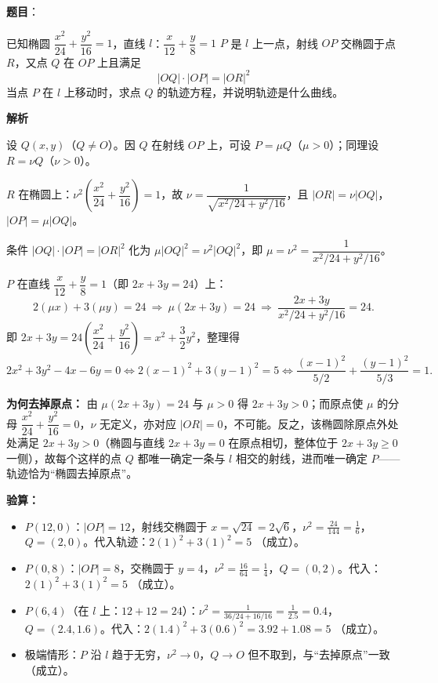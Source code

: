 \begin{answer}

\textbf{题目}：

已知椭圆 $\dfrac{x^2}{24}+\dfrac{y^2}{16}=1$，直线 $l$：$\dfrac{x}{12}+\dfrac{y}{8}=1$
$P$ 是 $l$ 上一点，射线 $OP$ 交椭圆于点 $R$，又点 $Q$ 在 $OP$ 上且满足
\nopagebreak[4]
\[
|OQ|\cdot|OP|=|OR|^2
\]
当点 $P$ 在 $l$ 上移动时，求点 $Q$ 的轨迹方程，并说明轨迹是什么曲线。

\textbf{解析}

设 $Q(x,y)$（$Q\ne O$）。因 $Q$ 在射线 $OP$ 上，可设 $P=\mu Q$（$\mu>0$）；同理设 $R=\nu Q$（$\nu>0$）。

$R$ 在椭圆上：$\nu^2\left(\dfrac{x^2}{24}+\dfrac{y^2}{16}\right)=1$，故 $\nu=\dfrac{1}{\sqrt{x^2/24+y^2/16}}$，且 $|OR|=\nu|OQ|$，$|OP|=\mu|OQ|$。

条件 $|OQ|\cdot|OP|=|OR|^2$ 化为 $\mu|OQ|^2=\nu^2|OQ|^2$，即 $\mu=\nu^2=\dfrac{1}{x^2/24+y^2/16}$。

$P$ 在直线 $\dfrac{x}{12}+\dfrac{y}{8}=1$（即 $2x+3y=24$）上：
\nopagebreak[4]
\[2(\mu x)+3(\mu y)=24\ \Longrightarrow\ \mu(2x+3y)=24\ \Longrightarrow\ \frac{2x+3y}{x^2/24+y^2/16}=24.\]
即 $2x+3y=24\left(\dfrac{x^2}{24}+\dfrac{y^2}{16}\right)=x^2+\dfrac32y^2$，整理得
\nopagebreak[4]
\[2x^2+3y^2-4x-6y=0\iff 2(x-1)^2+3(y-1)^2=5\iff \frac{(x-1)^2}{5/2}+\frac{(y-1)^2}{5/3}=1.\]

\textbf{为何去掉原点：} 由 $\mu(2x+3y)=24$ 与 $\mu>0$ 得 $2x+3y>0$；而原点使 $\mu$ 的分母 $\dfrac{x^2}{24}+\dfrac{y^2}{16}=0$，$\nu$ 无定义，亦对应 $|OR|=0$，不可能。反之，该椭圆除原点外处处满足 $2x+3y>0$（椭圆与直线 $2x+3y=0$ 在原点相切，整体位于 $2x+3y\ge0$ 一侧），故每个这样的点 $Q$ 都唯一确定一条与 $l$ 相交的射线，进而唯一确定 $P$——轨迹恰为“椭圆去掉原点”。

\textbf{验算：}
\begin{itemize}
\item $P(12,0)$：$|OP|=12$，射线交椭圆于 $x=\sqrt{24}=2\sqrt6$，$\nu^2=\frac{24}{144}=\frac16$，$Q=(2,0)$。代入轨迹：$2(1)^2+3(1)^2=5$ （成立）。
\item $P(0,8)$：$|OP|=8$，交椭圆于 $y=4$，$\nu^2=\frac{16}{64}=\frac14$，$Q=(0,2)$。代入：$2(1)^2+3(1)^2=5$ （成立）。
\item $P(6,4)$（在 $l$ 上：$12+12=24$）：$\nu^2=\frac{1}{36/24+16/16}=\frac{1}{2.5}=0.4$，$Q=(2.4,1.6)$。代入：$2(1.4)^2+3(0.6)^2=3.92+1.08=5$ （成立）。
\item 极端情形：$P$ 沿 $l$ 趋于无穷，$\nu^2\to0$，$Q\to O$ 但不取到，与“去掉原点”一致 （成立）。
\end{itemize}


\par\medskip

\end{answer}